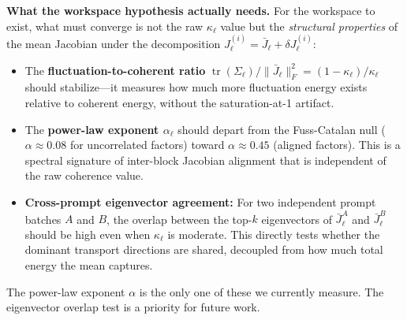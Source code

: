 \documentclass[11pt,a4paper]{article}
\begin{document}
\textbf{What the workspace hypothesis actually needs.} For the workspace to exist, what must converge is not the raw $\kappa_\ell$ value but the \emph{structural properties} of the mean Jacobian under the decomposition $J_\ell^{(i)} = \bar{J}_\ell + \delta J_\ell^{(i)}$:
\begin{itemize}
  \item The \textbf{fluctuation-to-coherent ratio} $\operatorname{tr}(\Sigma_\ell)/\|\bar{J}_\ell\|_F^2 = (1-\kappa_\ell)/\kappa_\ell$ should stabilize---it measures how much more fluctuation energy exists relative to coherent energy, without the saturation-at-1 artifact.
  \item The \textbf{power-law exponent $\alpha_\ell$} should depart from the Fuss-Catalan null ($\alpha \approx 0.08$ for uncorrelated factors) toward $\alpha \approx 0.45$ (aligned factors). This is a spectral signature of inter-block Jacobian alignment that is independent of the raw coherence value.
  \item \textbf{Cross-prompt eigenvector agreement:} For two independent prompt batches $A$ and $B$, the overlap between the top-$k$ eigenvectors of $\bar{J}_\ell^A$ and $\bar{J}_\ell^B$ should be high even when $\kappa_\ell$ is moderate. This directly tests whether the dominant transport directions are shared, decoupled from how much total energy the mean captures.
\end{itemize}
The power-law exponent $\alpha$ is the only one of these we currently measure. The eigenvector overlap test is a priority for future work.
\end{document}
